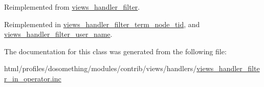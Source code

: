 Reimplemented from \hyperlink{classviews__handler__filter_ae71b3b09b75932ec6a8db33d56d41035}{views\_\-handler\_\-filter}.

Reimplemented in \hyperlink{classviews__handler__filter__term__node__tid_a48244c2456ac78e1855d9a48632ce045}{views\_\-handler\_\-filter\_\-term\_\-node\_\-tid}, and \hyperlink{classviews__handler__filter__user__name_a35fcdce7daf9bf61ea69bee242d48cf2}{views\_\-handler\_\-filter\_\-user\_\-name}.

The documentation for this class was generated from the following file:\begin{DoxyCompactItemize}
\item 
html/profiles/dosomething/modules/contrib/views/handlers/\hyperlink{views__handler__filter__in__operator_8inc}{views\_\-handler\_\-filter\_\-in\_\-operator.inc}\end{DoxyCompactItemize}

